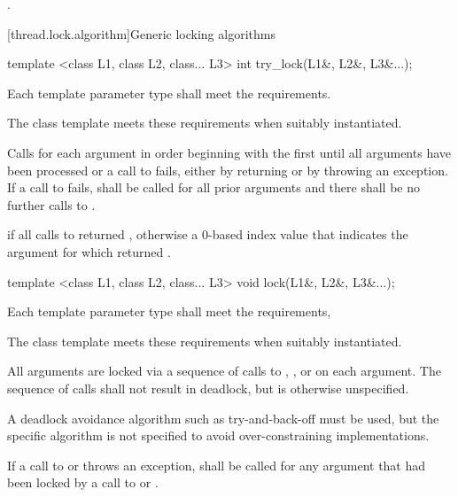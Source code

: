\begin{itemdescr}
\pnum
\returns {}.
\end{itemdescr}

[thread.lock.algorithm]{Generic locking algorithms}

%
\begin{itemdecl}
template <class L1, class L2, class... L3> int try_lock(L1&, L2&, L3&...);
\end{itemdecl}

\begin{itemdescr}
\pnum
\requires Each template parameter type shall meet the  requirements. \begin{note} The
 class template meets these requirements when suitably instantiated.
\end{note}

\pnum
\effects Calls  for each argument in order beginning with the
first until all arguments have been processed or a call to  fails,
either by returning  or by throwing an exception. If a call to
 fails,  shall be called for all prior arguments
and there shall be no further calls to .

\pnum
\returns {} if all calls to  returned ,
otherwise a 0-based index value that indicates the argument for which 
returned .
\end{itemdescr}

%
\begin{itemdecl}
template <class L1, class L2, class... L3> void lock(L1&, L2&, L3&...);
\end{itemdecl}

\begin{itemdescr}
\pnum
\requires Each template parameter type shall meet the  requirements,
\begin{note} The
 class template meets these requirements when suitably instantiated.
\end{note}

\pnum
\effects All arguments are locked via a sequence of calls to ,
, or  on each argument. The sequence of calls shall
not result in deadlock, but is otherwise unspecified. \begin{note} A deadlock avoidance
algorithm such as try-and-back-off must be used, but the specific algorithm is not
specified to avoid over-constraining implementations. \end{note} If a call to
 or  throws an exception,  shall be
called for any argument that had been locked by a call to  or
.
\end{itemdescr}

